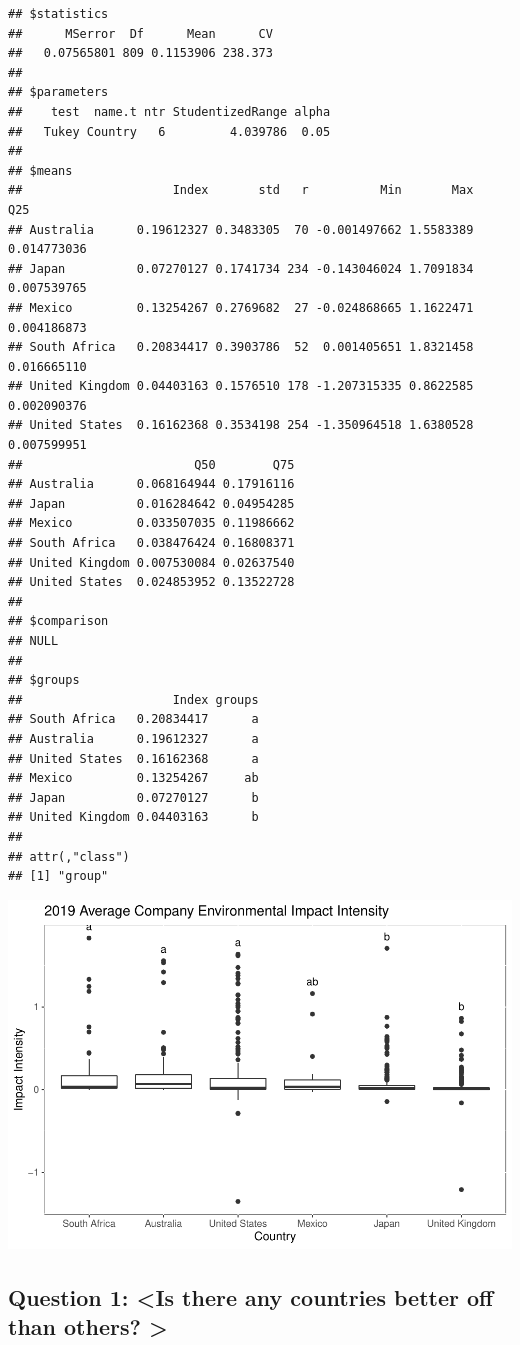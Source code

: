 \documentclass[
  12pt,
]{article}
\begin{document}
\begin{verbatim}
## $statistics
##      MSerror  Df      Mean      CV
##   0.07565801 809 0.1153906 238.373
## 
## $parameters
##    test  name.t ntr StudentizedRange alpha
##   Tukey Country   6         4.039786  0.05
## 
## $means
##                     Index       std   r          Min       Max         Q25
## Australia      0.19612327 0.3483305  70 -0.001497662 1.5583389 0.014773036
## Japan          0.07270127 0.1741734 234 -0.143046024 1.7091834 0.007539765
## Mexico         0.13254267 0.2769682  27 -0.024868665 1.1622471 0.004186873
## South Africa   0.20834417 0.3903786  52  0.001405651 1.8321458 0.016665110
## United Kingdom 0.04403163 0.1576510 178 -1.207315335 0.8622585 0.002090376
## United States  0.16162368 0.3534198 254 -1.350964518 1.6380528 0.007599951
##                        Q50        Q75
## Australia      0.068164944 0.17916116
## Japan          0.016284642 0.04954285
## Mexico         0.033507035 0.11986662
## South Africa   0.038476424 0.16808371
## United Kingdom 0.007530084 0.02637540
## United States  0.024853952 0.13522728
## 
## $comparison
## NULL
## 
## $groups
##                     Index groups
## South Africa   0.20834417      a
## Australia      0.19612327      a
## United States  0.16162368      a
## Mexico         0.13254267     ab
## Japan          0.07270127      b
## United Kingdom 0.04403163      b
## 
## attr(,"class")
## [1] "group"
\end{verbatim}

\includegraphics{QiuWangXu_ENV872_Finalproject_files/figure-latex/unnamed-chunk-6-1.pdf}

\hypertarget{question-1-is-there-any-countries-better-off-than-others}{%
\subsection{Question 1: \textless Is there any countries better off than
others?
\textgreater{}}\label{question-1-is-there-any-countries-better-off-than-others}}
\end{document}

